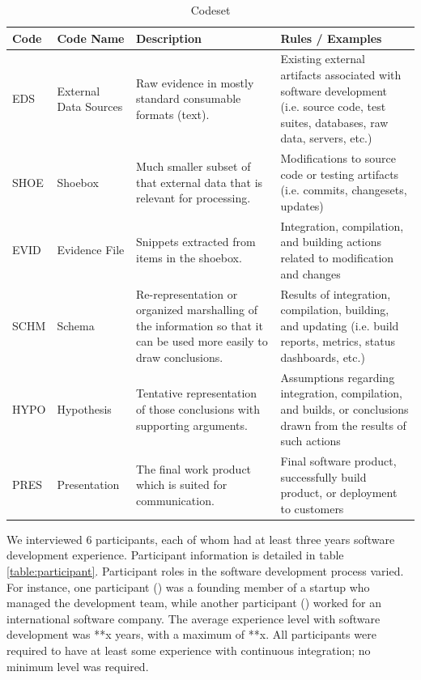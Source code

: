 \documentclass{sig-alternate}
\begin{document}
\begin{table}
\label{table:codeset}
\centering
\caption{Codeset}
\begin{tabular}[b]{ | l | l | p{5.5cm} | p{6.5cm} | }
	\hline
	\rowcolor{black!20!} Code & Code Name & Description & Rules / Examples \\ \hline
	EDS & External Data Sources & Raw evidence in mostly standard consumable formats (text). & Existing external artifacts associated with software development (i.e. source code, test suites, databases, raw data, servers, etc.) \\ \hline
	SHOE & Shoebox & Much smaller subset of that external data that is relevant for processing. & Modifications to source code or testing artifacts (i.e. commits, changesets, updates) \\ \hline
	EVID & Evidence File & Snippets extracted from items in the shoebox. & Integration, compilation, and building actions related to modification and changes \\ \hline
	SCHM & Schema & Re-representation or organized marshalling of the information so that it can be used more easily to draw conclusions. & Results of integration, compilation, building, and updating (i.e. build reports, metrics, status dashboards, etc.) \\ \hline
	HYPO & Hypothesis & Tentative representation of those conclusions with supporting arguments. & Assumptions regarding integration, compilation, and builds, or conclusions drawn from the results of such actions \\ \hline
	PRES & Presentation & The final work product which is suited for communication. & Final software product, successfully build product, or deployment to customers \\ \hline
\end{tabular}
\end{table}

We interviewed 6 participants, each of whom had at least three years software development experience. Participant information is detailed in table \ref{table:participant}. Participant roles in the software development process varied. For instance, one participant (\cpg) was a founding member of a startup who managed the development team, while another participant (\david) worked for an international software company. The average experience level with software development was **x years, with a maximum of **x. All participants were required to have at least some experience with continuous integration; no minimum level was required.
\end{document}
